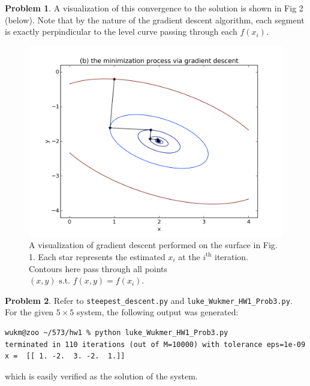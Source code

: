 \documentclass[10pt]{article}
\theoremstyle{plain}
\theoremstyle{definition}
\newtheorem{prob}{Problem}
\numberwithin{equation}{section}
\providecommand{\st}{\text{ s.t. }}
\begin{document}
\begin{prob}
    A visualization of this convergence to the solution is shown in Fig 2
    (below).  Note that by the nature of the gradient descent algorithm, each
    segment is exactly perpindicular to the level curve passing through each
    $f(x_i)$.

    \begin{figure}[t]
        \centering
        \includegraphics[width=\textwidth]{fig2}
        \caption{A visualization of gradient descent performed on the surface
            in Fig. 1. Each star represents the estimated $x_i$ at the
            $i^{\text{th}}$ iteration. Contours here pass through all points
            $(x,y) \st f(x,y) = f(x_i).$
        }
    \end{figure}
\end{prob}

\hrulefill
\clearpage
\begin{prob}

    Refer to \texttt{steepest\_descent.py} and \texttt{luke\_Wukmer\_HW1\_Prob3.py}.
    For the given $5\times5$ system, the following output was generated:

\begin{verbatim}
wukm@zoo ~/573/hw1 % python luke_Wukmer_HW1_Prob3.py
terminated in 110 iterations (out of M=10000) with tolerance eps=1e-09
x =  [[ 1. -2.  3. -2.  1.]]
 \end{verbatim}

 which is easily verified as the solution of the system.
\end{prob}
\hrulefill
\end{document}
